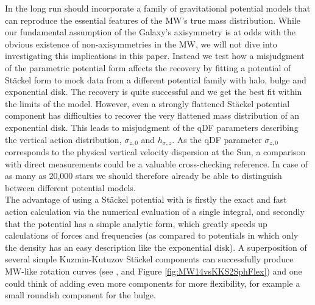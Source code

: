 
  In the long run \RM{} should incorporate a family of gravitational potential models that can reproduce the essential features of the MW's true mass distribution. While our fundamental assumption of the Galaxy's axisymmetry is at odds with the obvious existence of non-axisymmetries in the MW, we will not dive into investigating this implications in this paper. Instead we test how a misjudgment of the parametric potential form affects the recovery by fitting a potential of St\"{a}ckel form \citep{1994AA...287...43B} to mock data from a different potential family with halo, bulge and exponential disk. The recovery is quite successful and we get the best fit within the limits of the model. However, even a strongly flattened St\"{a}ckel potential component has difficulties to recover the very flattened mass distribution of an exponential disk. This leads to misjudgment of the qDF parameters describing the vertical action distribution, $\sigma_{z,0}$ and $h_{\sigma,z}$. As the qDF parameter $\sigma_{z,0}$ corresponds to the physical vertical velocity dispersion at the Sun, a comparison with direct measurements could be a valuable cross-checking reference.  In case of as many as 20,000 stars we should therefore already be able to distinguish between different potential models.
\\The advantage of using a St\"{a}ckel potential with \RM{} is firstly the exact and fast action calculation via the numerical evaluation of a single integral, and secondly that the potential has a simple analytic form, which greatly speeds up calculations of forces and frequencies (as compared to potentials in which only the density has an easy description like the exponential disk). A superposition of several simple Kuzmin-Kutuzov St\"{a}ckel components can successfully produce MW-like rotation curves (see \citet{1994AA...287...43B}, \citet{2003MNRAS.340..752F} and Figure \ref{fig:MW14vsKKS2SphFlex}) and one could think of adding even more components for more flexibility, for example a small roundish component for the bulge. 
